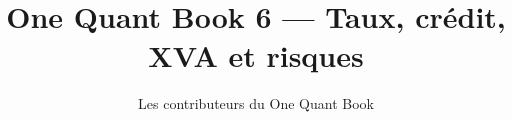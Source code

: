 \documentclass[11pt,a4paper,twoside,openany]{book}
\title{One Quant Book 6 --- Taux, crédit, XVA et risques}
\author{Les contributeurs du One Quant Book}
\date{\bookdate}
\begin{document}
\frontmatter



\tableofcontents

\mainmatter


\appendix
\part{\omsolutionspart}


\backmatter
\printindex
\end{document}
